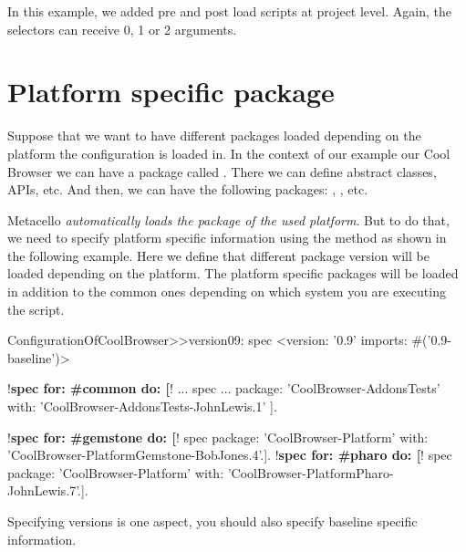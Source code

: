 \documentclass[a4paper,10pt,twoside]{book}
\begin{document}
In this example, we added pre and post load scripts at project level. Again, the selectors can receive 0, 1 or 2 arguments.


\section {Platform specific package}

Suppose that we want to have different packages loaded depending on the platform the configuration is loaded in. In the context of our example our Cool Browser we can have a package called . There we can define abstract classes, APIs, etc. And then, we can have the following packages: , , etc.

Metacello \emph{automatically loads the package of the used platform}. But to do that, we need to specify platform specific information using the method  as shown in the following example. Here we define that different package version will be loaded depending on the platform. The platform specific packages will be loaded in addition to the common ones depending on which system you are executing the script.

\begin{code}{}
ConfigurationOfCoolBrowser>>version09: spec
       <version: '0.9' imports: #('0.9-baseline')>

       !\textbf{spec for: \#common do: [}!
              ...
              spec
                 ...
                     package: 'CoolBrowser-AddonsTests' with: 'CoolBrowser-AddonsTests-JohnLewis.1' ].

       !\textbf{spec for: \#gemstone do: [}!
              spec package: 'CoolBrowser-Platform' with: 'CoolBrowser-PlatformGemstone-BobJones.4'.].
       !\textbf{spec for: \#pharo do: [}!
              spec package: 'CoolBrowser-Platform' with: 'CoolBrowser-PlatformPharo-JohnLewis.7'.].
\end{code}

Specifying versions is one aspect, you should also specify baseline specific information.
\end{document}

